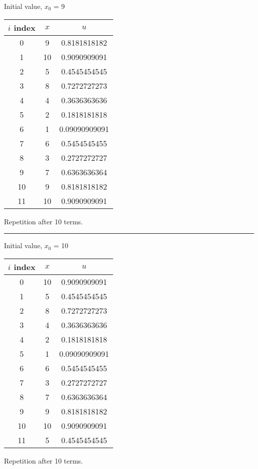 \documentclass{article}
\begin{document}
Initial value, $x_0$ = 9
\begin{center} \begin{tabular}{||c | c | c||}  \hline
		$i$ index & $x$ & $u$ \\ [0.5ex] \hline \hline0 & 9 & 0.8181818182\\
		\hline 
		1 & 10 & 0.9090909091\\
		\hline 
		2 & 5 & 0.4545454545\\
		\hline 
		3 & 8 & 0.7272727273\\
		\hline 
		4 & 4 & 0.3636363636\\
		\hline 
		5 & 2 & 0.1818181818\\
		\hline 
		6 & 1 & 0.09090909091\\
		\hline 
		7 & 6 & 0.5454545455\\
		\hline 
		8 & 3 & 0.2727272727\\
		\hline 
		9 & 7 & 0.6363636364\\
		\hline 
		10 & 9 & 0.8181818182\\
		\hline 
		11 & 10 & 0.9090909091\\
		\hline 
	\end{tabular} 
\end{center} Repetition after 10 terms.
\\ \noindent\rule[0.5ex]{\linewidth}{1pt}
Initial value, $x_0$ = 10
\begin{center} \begin{tabular}{||c | c | c||}  \hline
		$i$ index & $x$ & $u$ \\ [0.5ex] \hline \hline0 & 10 & 0.9090909091\\
		\hline 
		1 & 5 & 0.4545454545\\
		\hline 
		2 & 8 & 0.7272727273\\
		\hline 
		3 & 4 & 0.3636363636\\
		\hline 
		4 & 2 & 0.1818181818\\
		\hline 
		5 & 1 & 0.09090909091\\
		\hline 
		6 & 6 & 0.5454545455\\
		\hline 
		7 & 3 & 0.2727272727\\
		\hline 
		8 & 7 & 0.6363636364\\
		\hline 
		9 & 9 & 0.8181818182\\
		\hline 
		10 & 10 & 0.9090909091\\
		\hline 
		11 & 5 & 0.4545454545\\
		\hline 
	\end{tabular} 
\end{center} Repetition after 10 terms.
\end{document}
